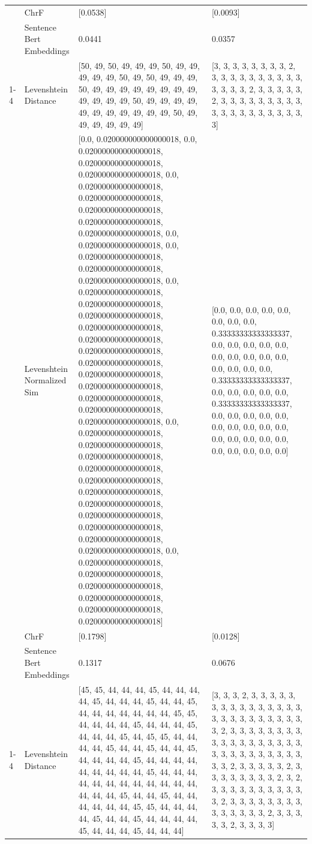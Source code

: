 \begin{tabular}{llll}
 & ChrF & [0.0538] & [0.0093] \\
 & Sentence Bert Embeddings & 0.0441 & 0.0357 \\
\cline{1-4}
\multirow[t]{4}{*}{Omwaana owegonjebwa, aweesa nyina ekitiibwa.} & Levenshtein Distance & [50, 49, 50, 49, 49, 49, 50, 49, 49, 49, 49, 49, 50, 49, 50, 49, 49, 49, 50, 49, 49, 49, 49, 49, 49, 49, 49, 49, 49, 49, 49, 50, 49, 49, 49, 49, 49, 49, 49, 49, 49, 49, 49, 50, 49, 49, 49, 49, 49, 49] & [3, 3, 3, 3, 3, 3, 3, 3, 2, 3, 3, 3, 3, 3, 3, 3, 3, 3, 3, 3, 3, 3, 3, 2, 3, 3, 3, 3, 3, 2, 3, 3, 3, 3, 3, 3, 3, 3, 3, 3, 3, 3, 3, 3, 3, 3, 3, 3, 3, 3] \\
 & Levenshtein Normalized Sim & [0.0, 0.020000000000000018, 0.0, 0.020000000000000018, 0.020000000000000018, 0.020000000000000018, 0.0, 0.020000000000000018, 0.020000000000000018, 0.020000000000000018, 0.020000000000000018, 0.020000000000000018, 0.0, 0.020000000000000018, 0.0, 0.020000000000000018, 0.020000000000000018, 0.020000000000000018, 0.0, 0.020000000000000018, 0.020000000000000018, 0.020000000000000018, 0.020000000000000018, 0.020000000000000018, 0.020000000000000018, 0.020000000000000018, 0.020000000000000018, 0.020000000000000018, 0.020000000000000018, 0.020000000000000018, 0.020000000000000018, 0.0, 0.020000000000000018, 0.020000000000000018, 0.020000000000000018, 0.020000000000000018, 0.020000000000000018, 0.020000000000000018, 0.020000000000000018, 0.020000000000000018, 0.020000000000000018, 0.020000000000000018, 0.020000000000000018, 0.0, 0.020000000000000018, 0.020000000000000018, 0.020000000000000018, 0.020000000000000018, 0.020000000000000018, 0.020000000000000018] & [0.0, 0.0, 0.0, 0.0, 0.0, 0.0, 0.0, 0.0, 0.33333333333333337, 0.0, 0.0, 0.0, 0.0, 0.0, 0.0, 0.0, 0.0, 0.0, 0.0, 0.0, 0.0, 0.0, 0.0, 0.33333333333333337, 0.0, 0.0, 0.0, 0.0, 0.0, 0.33333333333333337, 0.0, 0.0, 0.0, 0.0, 0.0, 0.0, 0.0, 0.0, 0.0, 0.0, 0.0, 0.0, 0.0, 0.0, 0.0, 0.0, 0.0, 0.0, 0.0, 0.0] \\
 & ChrF & [0.1798] & [0.0128] \\
 & Sentence Bert Embeddings & 0.1317 & 0.0676 \\
\cline{1-4}
\multirow[t]{4}{*}{Enjovu ebbiri wezilwanira, essubi lisesetera.} & Levenshtein Distance & [45, 45, 44, 44, 44, 45, 44, 44, 44, 44, 45, 44, 44, 44, 45, 44, 44, 45, 44, 44, 44, 44, 44, 44, 44, 45, 45, 44, 44, 44, 44, 45, 44, 44, 44, 45, 44, 44, 44, 45, 44, 45, 45, 44, 44, 44, 44, 45, 44, 44, 45, 44, 44, 45, 44, 44, 44, 44, 45, 44, 44, 44, 44, 44, 44, 44, 44, 44, 45, 44, 44, 44, 44, 44, 44, 44, 44, 44, 44, 44, 44, 44, 44, 44, 45, 44, 44, 45, 44, 44, 44, 44, 44, 44, 45, 45, 44, 44, 44, 44, 45, 44, 44, 45, 44, 44, 44, 44, 45, 44, 44, 44, 45, 44, 44, 44] & [3, 3, 3, 2, 3, 3, 3, 3, 3, 3, 3, 3, 3, 3, 3, 3, 3, 3, 3, 3, 3, 3, 3, 3, 3, 3, 3, 3, 3, 3, 2, 3, 3, 3, 3, 3, 3, 3, 3, 3, 3, 3, 3, 3, 3, 3, 3, 3, 3, 3, 3, 3, 3, 3, 3, 3, 3, 3, 3, 3, 3, 2, 3, 3, 3, 3, 3, 2, 3, 3, 3, 3, 3, 3, 3, 3, 2, 3, 2, 3, 3, 3, 3, 3, 3, 3, 3, 3, 3, 3, 2, 3, 3, 3, 3, 3, 3, 3, 3, 3, 3, 3, 3, 3, 3, 2, 3, 3, 3, 3, 3, 2, 3, 3, 3, 3] \\

\end{tabular}
